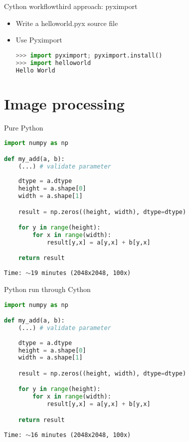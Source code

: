 \documentclass[dvipsnames]{beamer}
\begin{document}
\begin{frame}[fragile]{Cython workflow}{third approach: pyximport}
\begin{itemize}
\item Write a helloworld.pyx source file
\item Use Pyximport
\begin{lstlisting}[language=Python]
>>> import pyximport; pyximport.install()
>>> import helloworld
Hello World
\end{lstlisting}
\end{itemize}
\end{frame}

\section{Image processing}

\begin{frame}{}
\end{frame}

\begin{frame}[fragile]{Pure Python}
\begin{lstlisting}[language=Python,caption={add1.py}]
import numpy as np

def my_add(a, b):
    (...) # validate parameter
	
    dtype = a.dtype
    height = a.shape[0]
    width = a.shape[1]

    result = np.zeros((height, width), dtype=dtype)

    for y in range(height):
        for x in range(width):
            result[y,x] = a[y,x] + b[y,x]

    return result
\end{lstlisting}
\pause
{\tt Time: $\sim$19 minutes (2048x2048, 100x)}
\end{frame}

\begin{frame}[fragile]{Python run through Cython}
\begin{lstlisting}[language=Python,caption={add2.pyx}]
import numpy as np

def my_add(a, b):
    (...) # validate parameter
	
    dtype = a.dtype
    height = a.shape[0]
    width = a.shape[1]

    result = np.zeros((height, width), dtype=dtype)

    for y in range(height):
        for x in range(width):
            result[y,x] = a[y,x] + b[y,x]

    return result
\end{lstlisting}
\pause
{\tt Time: $\sim$16 minutes (2048x2048, 100x)}
\end{frame}
\end{document}
